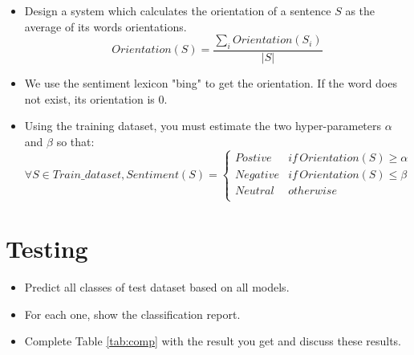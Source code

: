 \documentclass{../extra/aakpract/aakpract}
\begin{document}
\begin{itemize}
	\item Design a system which calculates the orientation of a sentence $S$ as the average of its words orientations. 
	\[Orientation(S) = \frac{\sum_i Orientation(S_i)}{|S|}\]
	\item We use the sentiment lexicon "bing" to get the orientation. If the word does not exist, its orientation is 0.
	\item Using the training dataset, you must estimate the two hyper-parameters $\alpha$ and $\beta$ so that:
	\[\forall S \in Train\_dataset, Sentiment(S) = 
	\begin{cases}
		Postive & if\,  Orientation(S) \ge \alpha \\
		Negative & if\,  Orientation(S) \le \beta \\
		Neutral & otherwise  \\
	\end{cases}
	\]
\end{itemize}

\section{Testing}

\begin{itemize}
	\item Predict all classes of test dataset based on all models.
	\item For each one, show the classification report.
	\item Complete Table \ref{tab:comp} with the result you get and discuss these results.
\end{itemize}
\end{document}

